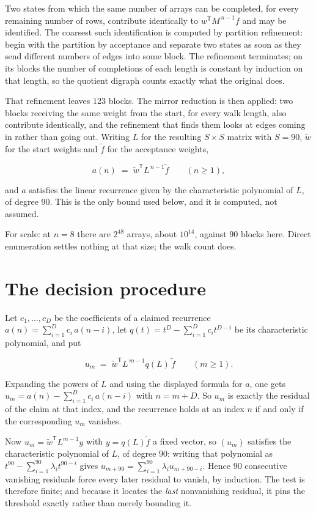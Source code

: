 \documentclass[11pt]{article}
\theoremstyle{definition}
\begin{document}
Two states from which the same number of arrays can be completed, for every remaining number of rows, contribute identically to $w^{\mathsf T}M^{\,n-1}f$ and may be identified. The coarsest such identification is computed by partition refinement: begin with the partition by acceptance and separate two states as soon as they send different numbers of edges into some block. The refinement terminates; on its blocks the number of completions of each length is constant by induction on that length, so the quotient digraph counts exactly what the original does.

That refinement leaves $123$ blocks. The mirror reduction is then applied: two blocks receiving the same weight from the start, for every walk length, also contribute identically, and the refinement that finds them looks at edges coming in rather than going out. Writing $L$ for the resulting $S \times S$ matrix with $S = 90$, $\tilde w$ for the start weights and $\tilde f$ for the acceptance weights,

\[a(n) \;=\; \tilde w^{\mathsf T} L^{\,n-1} \tilde f \qquad (n \ge 1),\]

and $a$ satisfies the linear recurrence given by the characteristic polynomial of $L$, of degree $90$. This is the only bound used below, and it is computed, not assumed.

For scale: at $n = 8$ there are $2^{48}$ arrays, about $10^{14}$, against $90$ blocks here. Direct enumeration settles nothing at that size; the walk count does.

\section{The decision procedure}

Let $c_1,\dots,c_D$ be the coefficients of a claimed recurrence $a(n) = \sum_{i=1}^{D} c_i\,a(n-i)$, let $q(t) = t^{D} - \sum_{i=1}^{D} c_i t^{D-i}$ be its characteristic polynomial, and put

\[u_m \;=\; \tilde w^{\mathsf T} L^{\,m-1} q(L)\,\tilde f \qquad (m \ge 1).\]

Expanding the powers of $L$ and using the displayed formula for $a$, one gets $u_m = a(n) - \sum_{i=1}^{D} c_i\,a(n-i)$ with $n = m + D$. So $u_m$ is exactly the residual of the claim at that index, and the recurrence holds at an index $n$ if and only if the corresponding $u_m$ vanishes.

Now $u_m = \tilde w^{\mathsf T} L^{m-1} y$ with $y = q(L)\tilde f$ a fixed vector, so $(u_m)$ satisfies the characteristic polynomial of $L$, of degree $90$: writing that polynomial as $t^{90} - \sum_{i=1}^{90} \lambda_i t^{90-i}$ gives $u_{m+90} = \sum_{i=1}^{90} \lambda_i u_{m+90-i}$. Hence $90$ consecutive vanishing residuals force every later residual to vanish, by induction. The test is therefore finite; and because it locates the {\itshape last} nonvanishing residual, it pins the threshold exactly rather than merely bounding it.
\end{document}
